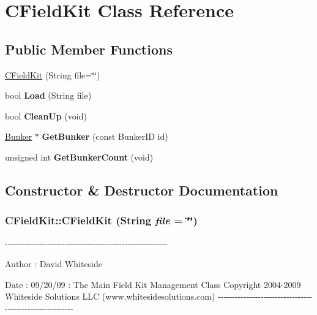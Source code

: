 \hypertarget{class_c_field_kit}{
\section{CFieldKit Class Reference}
\label{class_c_field_kit}
}
\subsection*{Public Member Functions}
\begin{DoxyCompactItemize}
\item 
\hyperlink{class_c_field_kit_a7fc3086528cdee821d24534a35a443d6}{CFieldKit} (String file=\char`\"{}\char`\"{})
\item 
\hypertarget{class_c_field_kit_a9b1058e1e95ace416ae1a0606ddc4267}{
bool {\bfseries Load} (String file)}
\label{class_c_field_kit_a9b1058e1e95ace416ae1a0606ddc4267}

\item 
\hypertarget{class_c_field_kit_a2401902a476561ad486c596a73112b89}{
bool {\bfseries CleanUp} (void)}
\label{class_c_field_kit_a2401902a476561ad486c596a73112b89}

\item 
\hypertarget{class_c_field_kit_aceb1f5e67d9ab65b0b9a861a655c584b}{
\hyperlink{struct_bunker}{Bunker} $\ast$ {\bfseries GetBunker} (const BunkerID id)}
\label{class_c_field_kit_aceb1f5e67d9ab65b0b9a861a655c584b}

\item 
\hypertarget{class_c_field_kit_a5d715f743e1e4c732f07365659554b87}{
unsigned int {\bfseries GetBunkerCount} (void)}
\label{class_c_field_kit_a5d715f743e1e4c732f07365659554b87}

\end{DoxyCompactItemize}


\subsection{Constructor \& Destructor Documentation}
\hypertarget{class_c_field_kit_a7fc3086528cdee821d24534a35a443d6}{
\subsubsection[{CFieldKit}]{\setlength{\rightskip}{0pt plus 5cm}CFieldKit::CFieldKit (String {\em file} = {\ttfamily \char`\"{}\char`\"{}})}}
\label{class_c_field_kit_a7fc3086528cdee821d24534a35a443d6}
-\/-\/-\/-\/-\/-\/-\/-\/-\/-\/-\/-\/-\/-\/-\/-\/-\/-\/-\/-\/-\/-\/-\/-\/-\/-\/-\/-\/-\/-\/-\/-\/-\/-\/-\/-\/-\/-\/-\/-\/-\/-\/-\/-\/-\/-\/-\/-\/-\/-\/-\/-\/-\/-\/-\/-\/-\/ \begin{DoxyAuthor}{Author}
: David Whiteside 
\end{DoxyAuthor}
\begin{DoxyDate}{Date}
: 09/20/09 : The Main Field Kit Management Class Copyright 2004-\/2009 Whiteside Solutions LLC (www.whitesidesolutions.com) -\/-\/-\/-\/-\/-\/-\/-\/-\/-\/-\/-\/-\/-\/-\/-\/-\/-\/-\/-\/-\/-\/-\/-\/-\/-\/-\/-\/-\/-\/-\/-\/-\/-\/-\/-\/-\/-\/-\/-\/-\/-\/-\/-\/-\/-\/-\/-\/-\/-\/-\/-\/-\/-\/-\/-\/-\/ 
\end{DoxyDate}



